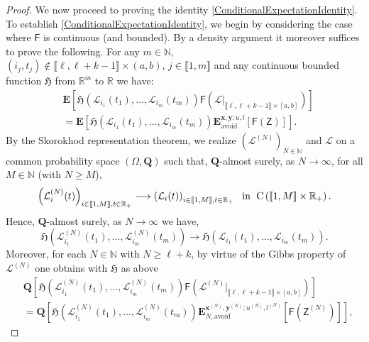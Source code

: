\documentclass[]{article}
\begin{document}
\begin{proof}
We now proceed to proving the identity
\eqref{ConditionalExpectationIdentity}.  To establish \eqref{ConditionalExpectationIdentity}, we begin by considering the case where $\mathsf{F}$ is continuous (and bounded). By a density argument it moreover suffices to  prove the following. For any $m \in \mathbb{N}$,  $(i_j,t_j) \notin \llbracket \ell, \ell+k-1 \rrbracket \times (a,b),\,j\in\llbracket 1,m\rrbracket$ and any continuous bounded function $\mathfrak{H}$ from $\mathbb{R}^m$ to $\mathbb{R}$ we have:
\begin{align}\label{ConditionalExpectWithFunction}
&\mathbf{E}\left[\mathfrak{H}\left (\mathcal{L}_{i_1}(t_1), \ldots, \mathcal{L}_{i_m}(t_m)\right)\mathsf{F}\left(\mathcal{L}|_{\llbracket \ell, \ell+k-1 \rrbracket \times [a,b]}\right)\right]\nonumber \\&= \mathbf{E}\left[\mathfrak{H}\left (\mathcal{L}_{i_1}(t_1), \ldots, \mathcal{L}_{i_m}(t_m)\right)\mathbf{E}_{\mathrm{avoid}}^{\mathbf{x},\mathbf{y};u,l}\left[\mathsf{F}(\mathsf{Z})\right]\right].
\end{align}
By the Skorokhod representation theorem, we realize $(\mathcal{L}^{(N)})_{N\in \mathbb{N}}$ and $\mathcal{L}$ on a common probability space $(\Omega,\mathbf{Q})$ such that, $\mathbf{Q}$-almost surely, as $N \longrightarrow \infty$, for all $M \in \mathbb{N}$ (with $N \ge M$),
\begin{align}\label{a.s.conv} \left(\mathcal{L}^{(N)}_{i}(t)\right)_{i\in \llbracket 1, M \rrbracket, t\in \mathbb{R}_+}\longrightarrow\left(\mathcal{L}_{i}(t)\right)_{i\in \llbracket 1, M \rrbracket, t\in \mathbb{R}_+} \ \textnormal{ in }\; \mathrm{C}\left(\llbracket 1, M \rrbracket \times\mathbb{R}_+\right).
\end{align}
Hence, $\mathbf{Q}$-almost surely, as $N \longrightarrow \infty$ we have,
\begin{equation}\label{ExtFnConv}
\mathfrak{H}\left (\mathcal{L}^{(N)}_{i_1}(t_1), \ldots, \mathcal{L}^{(N)}_{i_m}(t_m)\right) \longrightarrow \mathfrak{H}\left (\mathcal{L}_{i_1}(t_1), \ldots, \mathcal{L}_{i_m}(t_m)\right).
\end{equation}
Moreover, for each \(N\in\mathbb{N}\)
with $N\ge  \ell+k$, by virtue of the Gibbs property of $\mathcal{L}^{(N)}$ one obtains with $\mathfrak{H}$ as above
\begin{align}
&\mathbf{Q}\left[\mathfrak{H}\left (\mathcal{L}^{(N)}_{i_1}(t_1), \ldots, \mathcal{L}^{(N)}_{i_m}(t_m)\right)\mathsf{F}\left(\mathcal{L}^{(N)}|_{\llbracket \ell, \ell+k-1 \rrbracket \times [a,b]}\right)\right]\nonumber
\\&= \mathbf{Q}\left[\mathfrak{H}\left (\mathcal{L}^{(N)}_{i_1}(t_1), \ldots, \mathcal{L}^{(N)}_{i_m}(t_m)\right) \mathbf{E}_{N,\mathrm{avoid}}^{\mathbf{x}^{(N)},\mathbf{y}^{(N)};u^{(N)},l^{(N)}}\left[\mathsf{F}\left(\mathsf{Z}^{(N)}\right)\right]\right]\label{BGP_N},

\end{align}
\end{proof}
\end{document}
